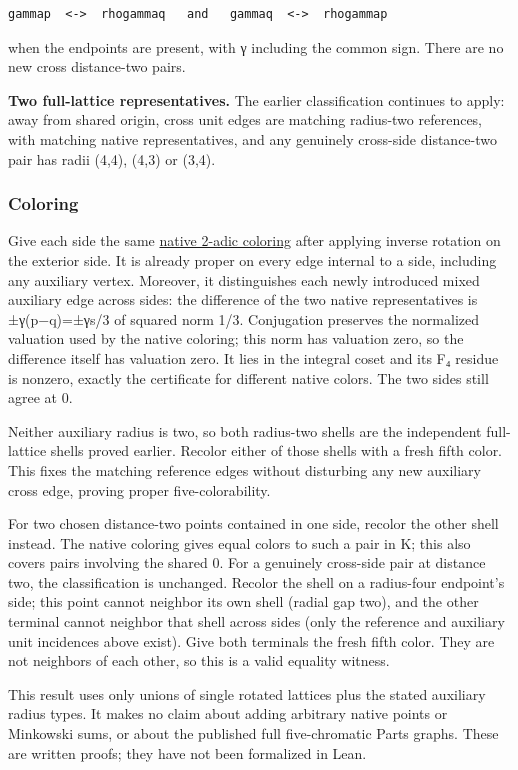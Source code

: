 \documentclass[
  11pt,
]{article}
\begin{document}
\begin{verbatim}
gammap  <->  rhogammaq   and   gammaq  <->  rhogammap
\end{verbatim}

when the endpoints are present, with γ including the common sign. There
are no new cross distance-two pairs.

\textbf{Two full-lattice representatives.} The earlier classification
continues to apply: away from shared origin, cross unit edges are
matching radius-two references, with matching native representatives,
and any genuinely cross-side distance-two pair has radii (4,4), (4,3) or
(3,4).

\subsubsection{Coloring}\label{coloring}

Give each side the same
\href{https://github.com/Aafimalek/novel-discoveries/tree/b2f2d863aa4903b8aee52efc006e26f3c8b738b8/hadwiger-nelson/verification/parts-native-field-obstruction}{native
2-adic coloring} after applying inverse rotation on the exterior side.
It is already proper on every edge internal to a side, including any
auxiliary vertex. Moreover, it distinguishes each newly introduced mixed
auxiliary edge across sides: the difference of the two native
representatives is ±γ(p−q)=±γs/3 of squared norm 1/3. Conjugation
preserves the normalized valuation used by the native coloring; this
norm has valuation zero, so the difference itself has valuation zero. It
lies in the integral coset and its F₄ residue is nonzero, exactly the
certificate for different native colors. The two sides still agree at 0.

Neither auxiliary radius is two, so both radius-two shells are the
independent full-lattice shells proved earlier. Recolor either of those
shells with a fresh fifth color. This fixes the matching reference edges
without disturbing any new auxiliary cross edge, proving proper
five-colorability.

For two chosen distance-two points contained in one side, recolor the
other shell instead. The native coloring gives equal colors to such a
pair in K; this also covers pairs involving the shared 0. For a
genuinely cross-side pair at distance two, the classification is
unchanged. Recolor the shell on a radius-four endpoint's side; this
point cannot neighbor its own shell (radial gap two), and the other
terminal cannot neighbor that shell across sides (only the reference and
auxiliary unit incidences above exist). Give both terminals the fresh
fifth color. They are not neighbors of each other, so this is a valid
equality witness.

This result uses only unions of single rotated lattices plus the stated
auxiliary radius types. It makes no claim about adding arbitrary native
points or Minkowski sums, or about the published full five-chromatic
Parts graphs. These are written proofs; they have not been formalized in
Lean.
\end{document}
